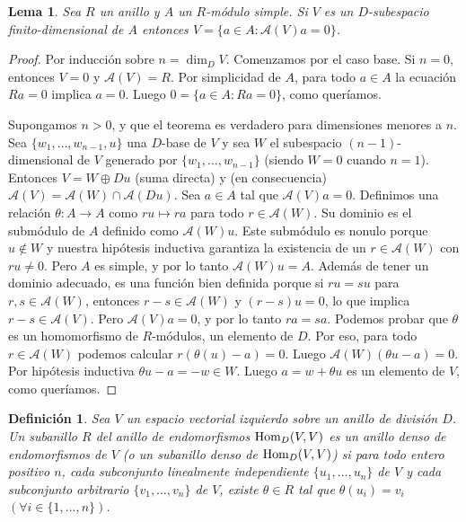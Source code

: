 \documentclass{report}
\newcommand{\Hom}{\textnormal{Hom}}
\newtheorem{lemma}{Lema}
\newtheorem{definition}{Definición}
\begin{document}
  \begin{lemma}
    \label{lemma:anihilatorLemma}
    Sea \(R\) un anillo y \(A\) un \(R\)-módulo simple.
    Si \(V\) es un \(D\)-subespacio finito-dimensional de \(A\) entonces \(V = \{a \in A : \mathcal{A}(V) a = 0\}\).
  \end{lemma}
  \begin{proof}
    Por inducción sobre \(n = \dim_D V\). 
    Comenzamos por el caso base.
    Si \(n = 0\), entonces \(V = 0\) y \(\mathcal{A}(V) = R\).
    Por simplicidad de \(A\), para todo \(a \in A\) la ecuación \(R a = 0\) implica \(a = 0\).
    Luego \(0 = \{a \in A : R a = 0\}\), como queríamos.

    Supongamos \(n > 0\), y que el teorema es verdadero para dimensiones menores a \(n\).
    Sea \(\{w_1, \dots, w_{n - 1}, u\}\) una \(D\)-base de \(V\) y sea \(W\) el subespacio \((n - 1)\)-dimensional de \(V\) generado por \(\{w_1, \dots, w_{n - 1}\}\) (siendo \(W = 0\) cuando \(n = 1\)).
    Entonces \(V = W \oplus D u\) (suma directa) y (en consecuencia) \(\mathcal{A}(V) = \mathcal{A}(W) \cap \mathcal{A}(D u)\).
    Sea \(a \in A\) tal que \(\mathcal{A}(V) a = 0\).
    Definimos una relación \(\theta : A \rightarrow A\) como \(r u \mapsto r a\) para todo \(r \in \mathcal{A}(W)\).
    Su dominio es el submódulo de \(A\) definido como \(\mathcal{A}(W) u\).
    Este submódulo es nonulo porque \(u \notin W\) y nuestra hipótesis inductiva garantiza la existencia de un \(r \in \mathcal{A}(W)\) con \(r u \neq 0\).
    Pero \(A\) es simple, y por lo tanto \(\mathcal{A}(W) u = A\).
    Además de tener un dominio adecuado, es una función bien definida porque si \(r u = s u\) para \(r, s \in \mathcal{A}(W)\), entonces \(r - s \in \mathcal{A}(W)\) y \((r - s) u = 0\), lo que implica \(r - s \in \mathcal{A}(V)\).
    Pero \(\mathcal{A}(V) a = 0\), y por lo tanto \(r a = s a\).
    Podemos probar que \(\theta\) es un homomorfismo de \(R\)-módulos, un elemento de \(D\).
    Por eso, para todo \(r \in \mathcal{A}(W)\) podemos calcular \(r (\theta(u) - a) = 0\).
    Luego \( \mathcal{A}(W) (\theta u - a) = 0\).
    Por hipótesis inductiva \(\theta u - a = - w \in W\).
    Luego \(a = w + \theta u\) es un elemento de \(V\), como queríamos.
  \end{proof}

  \begin{definition}
    Sea \(V\) un espacio vectorial izquierdo sobre un anillo de división \(D\).
    Un subanillo \(R\) del anillo de endomorfismos \(\Hom_D(V, V)\) es un \emph{anillo denso de endomorfismos} de \(V\) (o un \emph{subanillo denso} de \(\Hom_D(V, V)\)) si para todo entero positivo \(n\), cada subconjunto linealmente independiente \(\{u_1, \dots, u_n\}\) de \(V\) y cada subconjunto arbitrario \(\{v_1, \dots, v_n\}\) de \(V\), existe \(\theta \in R\) tal que \(\theta(u_i) = v_i\) \((\forall i \in \{1, \dots, n\})\).
  \end{definition}
\end{document}
